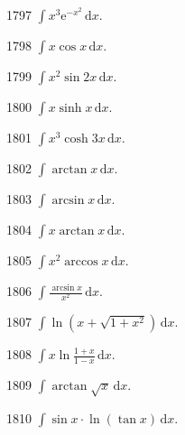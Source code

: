 \begin{prob}[S]{1797}
$\int x^3 \mathrm{e}^{-x^2}\,\mathrm{d}x$.
\end{prob}

\begin{prob}[S]{1798}
$\int x\cos x\,\mathrm{d}x$.
\end{prob}

\begin{prob}[S]{1799}
$\int x^2 \sin 2x\,\mathrm{d}x$.
\end{prob}

\begin{prob}[S]{1800}
$\int x\sinh x\,\mathrm{d}x$.
\end{prob}

\begin{prob}[S]{1801}
$\int x^3 \cosh 3x\,\mathrm{d}x$.
\end{prob}

\begin{prob}[S]{1802}
$\int \arctan x\,\mathrm{d}x$.
\end{prob}

\begin{prob}[S]{1803}
$\int \arcsin x\,\mathrm{d}x$.
\end{prob}

\begin{prob}[S]{1804}
$\int x\arctan x\,\mathrm{d}x$.
\end{prob}

\begin{prob}[S]{1805}
$\int x^2 \arccos x\,\mathrm{d}x$.
\end{prob}

\begin{prob}[S]{1806}
$\int \frac{\arcsin x}{x^2}\,\mathrm{d}x$.
\end{prob}

\begin{prob}[S]{1807}
$\int \ln(x + \sqrt{1 + x^2})\,\mathrm{d}x$.
\end{prob}

\begin{prob}[S]{1808}
$\int x\ln\frac{1 + x}{1 - x}\,\mathrm{d}x$.
\end{prob}

\begin{prob}[S]{1809}
$\int \arctan\sqrt{x}\,\mathrm{d}x$.
\end{prob}

\begin{prob}[S]{1810}
$\int \sin x \cdot \ln(\tan x)\,\mathrm{d}x$.
\end{prob}

